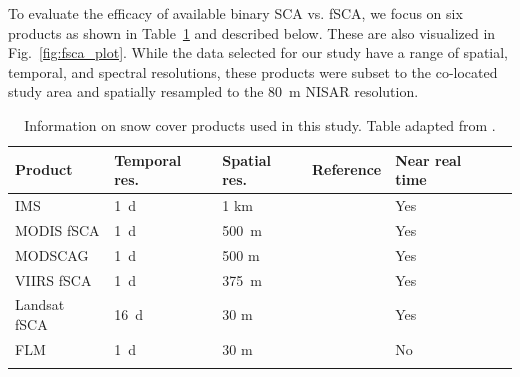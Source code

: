 To evaluate the efficacy of available binary SCA vs. fSCA, we focus on six products as shown in Table~\ref{table:fsca_product_info} and described below. These are also visualized in Fig.~\ref{fig:fsca_plot}. While the data selected for our study have a range of spatial, temporal, and spectral resolutions, these products were subset to the co-located study area and spatially resampled to the 80~m NISAR resolution.  


\begin{table}[htbp]
\centering
\caption{Information on snow cover products used in this study. Table adapted from \cite{stillingerLandsatMODISVIIRS2023}.}
\label{tab:snow_cover_products}
\begin{tabular}{llllll}
\toprule
Product & Temporal res. & Spatial res. & Reference & Near real time \\ 
\midrule
IMS        & 1~d & 1 km      & \cite{helfrichEnhancementsForthcomingDevelopments2007} & Yes \\ 
MODIS fSCA & 1~d & 500~m     & \cite{hallEvaluationMODISVIIRS2019}  & Yes \\ 
MODSCAG    & 1~d  & 500 m    & \cite{painterRetrievalSubpixelSnow2009} & Yes \\ 
VIIRS fSCA & 1~d & 375~m     & \cite{hallEvaluationMODISVIIRS2019} & Yes \\ 
Landsat fSCA  & 16~d & 30 m  & \cite{selkowitzUSGSLandsatSnow2017} & Yes \\ 
FLM        & 1~d  & 30 m     & \cite{rittgerMultisensorFusionUsing2021} & No \\ 
\bottomrule
\label{table:fsca_product_info}
\end{tabular}
\end{table}

